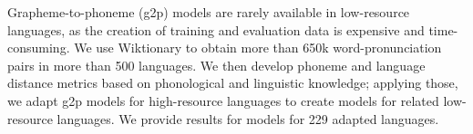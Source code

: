 Grapheme-to-phoneme (g2p) models are rarely available in low-resource languages, as the creation of training and evaluation data is expensive and time-consuming. We use Wiktionary to obtain more than 650k word-pronunciation pairs in more than 500 languages. We then develop phoneme and language distance metrics based on phonological and linguistic knowledge; applying those, we adapt g2p models for high-resource languages to create models for related low-resource languages. We provide results for models for 229 adapted languages.
